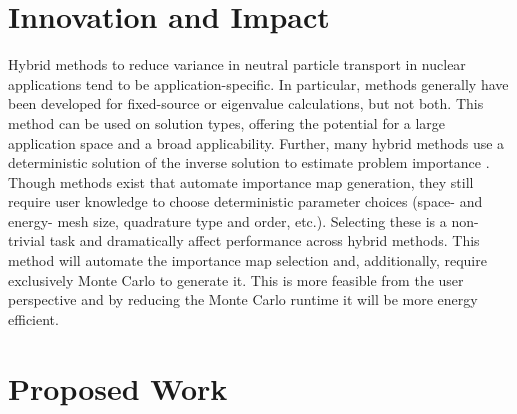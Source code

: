 \documentclass[letterpaper,12pt]{article}
\begin{document}
\section{Innovation and Impact}
Hybrid methods to reduce variance in neutral particle transport in nuclear
applications tend to be application-specific. In particular, methods generally
have been developed for fixed-source or eigenvalue calculations, but not both.
This method can be used on solution types, offering the potential for
a large application space and a broad applicability. Further, many hybrid
methods use a deterministic solution of the inverse solution to estimate problem
importance\cite{wagner_automated_1998, wagner_automated_2009,
haghighat_monte_2003, zhang_adjoint-based_2011, hoogenboom_optimum_1979} . Though methods exist that automate importance map
generation\cite{hendricks_mcnp_1985, burn_optimizing_2014,
  van_wijk_easy_2011, wagner_automated_1998, wagner_automated_2009,
haghighat_monte_2003, zhang_adjoint-based_2011, hoogenboom_optimum_1979},
they still require user knowledge to choose deterministic
parameter choices (space- and energy- mesh size, quadrature type and order,
etc.). Selecting these is a non-trivial task and dramatically affect performance
across hybrid methods. This method will automate the importance map selection
and, additionally, require exclusively Monte Carlo to generate it. This is more
feasible from the user perspective and by reducing the Monte Carlo runtime it
will be more energy efficient.


\section{Proposed Work}
\end{document}
